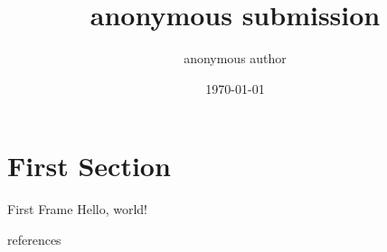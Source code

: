 \documentclass{beamer}
\date{\today}
\title{anonymous submission}
\author{anonymous author}
\institute{anonymous university}
\begin{document}
  \maketitle
  \section{First Section}
  \begin{frame}{First Frame}
    Hello, world!\cite{greenwade93}
  \end{frame}

  \begin{frame}{references}
    
    
  \end{frame}
\end{document}
